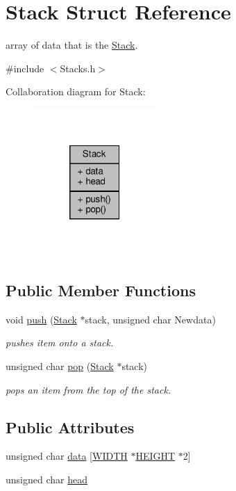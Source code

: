 \hypertarget{structStack}{}\section{Stack Struct Reference}
\label{structStack}


array of data that is the \hyperlink{structStack}{Stack}.  




{\ttfamily \#include $<$Stacks.\+h$>$}



Collaboration diagram for Stack\+:
\nopagebreak
\begin{figure}[H]
\begin{center}
\leavevmode
\includegraphics[width=133pt]{structStack__coll__graph}
\end{center}
\end{figure}
\subsection*{Public Member Functions}
\begin{DoxyCompactItemize}
\item 
void \hyperlink{structStack_a0bd90a5dfacc09f2df0382c269e0236b}{push} (\hyperlink{structStack}{Stack} $\ast$stack, unsigned char Newdata)
\begin{DoxyCompactList}\small\item\em pushes item onto a stack. \end{DoxyCompactList}\item 
unsigned char \hyperlink{structStack_aa2c179f9f71cccf23778012d4e9326de}{pop} (\hyperlink{structStack}{Stack} $\ast$stack)
\begin{DoxyCompactList}\small\item\em pops an item from the top of the stack. \end{DoxyCompactList}\end{DoxyCompactItemize}
\subsection*{Public Attributes}
\begin{DoxyCompactItemize}
\item 
unsigned char \hyperlink{structStack_af7c19f315867ae89b59eb06bb1e6c8bf}{data} \mbox{[}\hyperlink{MappingFunctions_8h_a241aeeb764887ae5e3de58b98f04b16d}{W\+I\+D\+TH} $\ast$\hyperlink{MappingFunctions_8h_aed89bd71aee8be823e8a20ec4e093c1e}{H\+E\+I\+G\+HT} $\ast$2\mbox{]}
\item 
unsigned char \hyperlink{structStack_ae9de4145f4aee2664247e585ec86d220}{head}
\end{DoxyCompactItemize}


